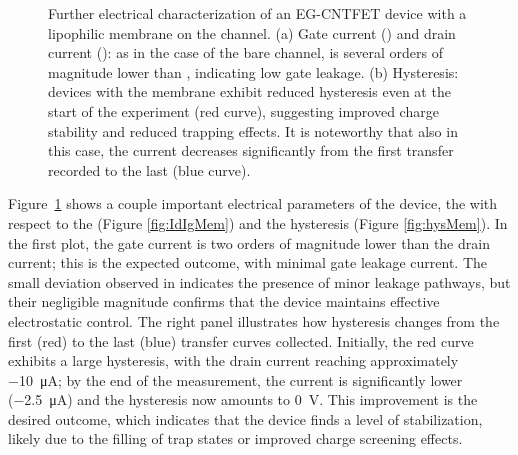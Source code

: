 \begin{figure}
    \centering
    \quad
    \caption{Further electrical characterization of an EG-CNTFET device with a lipophilic membrane on the channel. 
    (a) Gate current (\igs{}) and drain current (\ids{}): as in the case of the bare channel, \igs{} is several orders of magnitude lower than \ids{}, indicating low gate leakage. 
    (b) Hysteresis: devices with the membrane exhibit reduced hysteresis even at the start of the experiment (red curve), suggesting improved charge stability and reduced trapping effects. It is noteworthy that also in this case, the current decreases significantly from the first transfer recorded to the last (blue curve).}
    \label{fig:parameters_Mem}
\end{figure}

Figure~\ref{fig:parameters_Mem} shows a couple important electrical parameters of the device, \ie{} the \igs{} with respect to the \ids{} (Figure \ref{fig:IdIgMem}) and the hysteresis (Figure \ref{fig:hysMem}). In the first plot, the gate current is two orders of magnitude lower than the drain current; this is the expected outcome, with minimal gate leakage current. The small deviation observed in \igs{} indicates the presence of minor leakage pathways, but their negligible magnitude confirms that the device maintains effective electrostatic control. The right panel illustrates how hysteresis changes from the first (red) to the last (blue) transfer curves collected. Initially, the red curve exhibits a large hysteresis, with the drain current reaching approximately \SI{-10}{\uA}; by the end of the measurement, the current is significantly lower (\SI{-2.5}{\uA}) and the hysteresis now amounts to \SI{0}{\V}. This improvement is the desired outcome, which indicates that the device finds a level of stabilization, likely due to the filling of trap states or improved charge screening effects.

